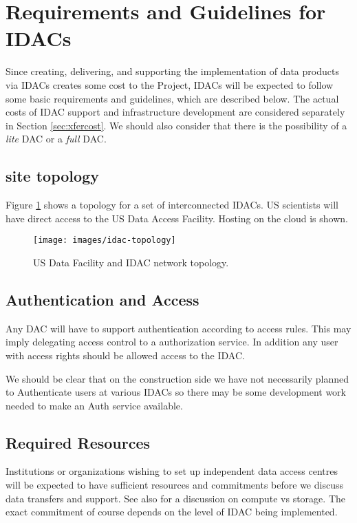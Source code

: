 \section{Requirements and Guidelines for IDACs}\label{sec:reqs}
Since creating, delivering, and supporting the implementation of \RO data products via IDACs creates some cost to the \RO Project, IDACs will be expected to follow some basic requirements and guidelines, which are described below.
The actual costs of \gls{IDAC} support and infrastructure development are considered separately in Section \ref{sec:xfercost}.
We should also consider that there is the possibility of a {\it lite} DAC or a {\it full} DAC.


\subsection{\RO site topology} \label{sec:topology}

Figure \ref{fig:idac-topology} shows a  topology for a set of interconnected IDACs.  \gls{US} scientists will have direct access to the \RO \gls{US} Data Access Facility.  Hosting on the cloud is shown.

\begin{figure}
\begin{center}
\texttt{[image: images/idac-topology]}
\caption{US Data Facility and \gls{IDAC} network topology.  \label{fig:idac-topology}}
\end{center}
\end{figure}

\subsection{Authentication and Access}\label{sec:auth}
Any DAC will have to support authentication according to \RO access rules. This may imply delegating access control to a \RO authorization service. In addition any user with access rights should be allowed access to the IDAC.

We should be clear that on the construction side we have not necessarily planned to Authenticate users at various IDACs so there may be some development work needed to make an Auth service available.

\subsection{Required Resources} \label{sec:resources}
Institutions or organizations wishing to set up independent data access centres will be expected to have
sufficient resources and commitments before we discuss data transfers and support.
See also  for a discussion on compute vs storage.
The exact commitment of course depends on the level of IDAC being implemented.

